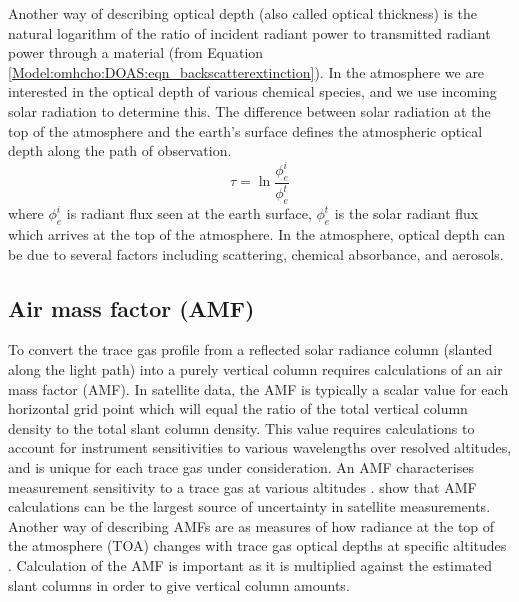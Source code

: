     Another way of describing optical depth (also called optical thickness) is the natural logarithm of the ratio of incident radiant power to transmitted radiant power through a material (from Equation \ref{Model:omhcho:DOAS:eqn_backscatterextinction}).
    In the atmosphere we are interested in the optical depth of various chemical species, and we use incoming solar radiation to determine this.
    The difference between solar radiation at the top of the atmosphere and the earth's surface defines the atmospheric optical depth along the path of observation.
    \begin{equation*}
      \tau = \ln{\frac{\phi_e^i}{\phi_e^t}}
    \end{equation*}
    where $\phi_e^i$ is radiant flux seen at the earth surface, $\phi_e^t$ is the solar radiant flux which arrives at the top of the atmosphere.
    In the atmosphere, optical depth can be due to several factors including scattering, chemical absorbance, and aerosols.
  
  \subsection{Air mass factor (AMF)}
  \label{Model:omhcho:amf}
    To convert the trace gas profile from a reflected solar radiance column (slanted along the light path) into a purely vertical column requires calculations of an air mass factor (AMF).
    In satellite data, the AMF is typically a scalar value for each horizontal grid point which will equal the ratio of the total vertical column density to the total slant column density.
    This value requires calculations to account for instrument sensitivities to various wavelengths over resolved altitudes, and is unique for each trace gas under consideration.
    An AMF characterises measurement sensitivity to a trace gas at various altitudes \cite[e.g.,]{Palmer2001}.
    \textcite{Lorente2017} show that AMF calculations can be the largest source of uncertainty in satellite measurements.
    Another way of describing AMFs are as measures of how radiance at the top of the atmosphere (TOA) changes with trace gas optical depths at specific altitudes \parencite{Lorente2017}.
    Calculation of the AMF is important as it is multiplied against the estimated slant columns in order to give vertical column amounts.
    
